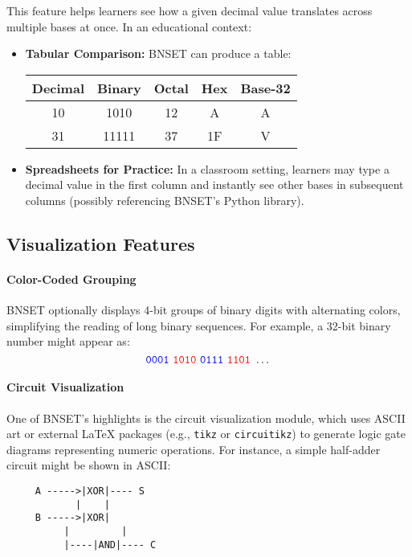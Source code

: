 \documentclass{article}
\begin{document}
\noindent This feature helps learners see how a given decimal value translates across multiple bases at once. In an educational context:
\begin{itemize}
  \item \textbf{Tabular Comparison:} BNSET can produce a table:

\begin{center}
\begin{tabular}{c|c|c|c|c}
\hline
\textbf{Decimal} & \textbf{Binary} & \textbf{Octal} & \textbf{Hex} & \textbf{Base-32} \\
\hline
10  & 1010         & 12    & A   & A  \\
31  & 11111        & 37    & 1F  & V  \\
\hline
\end{tabular}
\end{center}

  \item \textbf{Spreadsheets for Practice:} In a classroom setting, learners may type a decimal value in the first column and instantly see other bases in subsequent columns (possibly referencing BNSET’s Python library).
\end{itemize}

\subsection{Visualization Features}
\label{sec:visualization-features}
\paragraph{Color-Coded Grouping}
BNSET optionally displays 4-bit groups of binary digits with alternating colors, simplifying the reading of long binary sequences. For example, a 32-bit binary number might appear as:
\[
\texttt{\color{blue}0001}~\texttt{\color{red}1010}~\texttt{\color{blue}0111}~\texttt{\color{red}1101}~\dots
\]

\paragraph{Circuit Visualization}
One of BNSET’s highlights is the circuit visualization module, which uses ASCII art or external \LaTeX{} packages (e.g., \texttt{tikz} or \texttt{circuitikz}) to generate logic gate diagrams representing numeric operations. For instance, a simple half-adder circuit might be shown in ASCII:

\begin{verbatim}
     A ----->|XOR|---- S
            |    |
     B ----->|XOR|
          |         |
          |----|AND|---- C
\end{verbatim}
\end{document}
